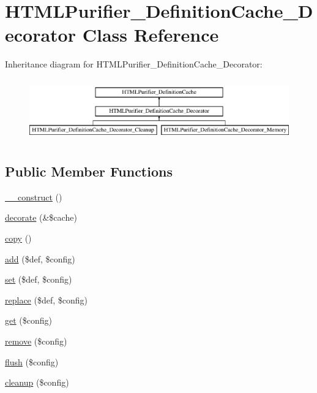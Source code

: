 \hypertarget{classHTMLPurifier__DefinitionCache__Decorator}{\section{H\+T\+M\+L\+Purifier\+\_\+\+Definition\+Cache\+\_\+\+Decorator Class Reference}
\label{classHTMLPurifier__DefinitionCache__Decorator}
}
Inheritance diagram for H\+T\+M\+L\+Purifier\+\_\+\+Definition\+Cache\+\_\+\+Decorator\+:\begin{figure}[H]
\begin{center}
\leavevmode
\includegraphics[height=2.700965cm]{classHTMLPurifier__DefinitionCache__Decorator}
\end{center}
\end{figure}
\subsection*{Public Member Functions}
\begin{DoxyCompactItemize}
\item 
\hyperlink{classHTMLPurifier__DefinitionCache__Decorator_a2c08b11ef2b39a3a256f2486c557488a}{\+\_\+\+\_\+construct} ()
\item 
\hyperlink{classHTMLPurifier__DefinitionCache__Decorator_a7e11368ddd75f7472efaf0010354e52d}{decorate} (\&\$cache)
\item 
\hyperlink{classHTMLPurifier__DefinitionCache__Decorator_aa9915b657c65ce426ea9145d6eb39fa2}{copy} ()
\item 
\hyperlink{classHTMLPurifier__DefinitionCache__Decorator_a303ee2de5ec896b11456081dbc5c0526}{add} (\$def, \$config)
\item 
\hyperlink{classHTMLPurifier__DefinitionCache__Decorator_afe7eec6c1fd107a2bb48cc4e37508c46}{set} (\$def, \$config)
\item 
\hyperlink{classHTMLPurifier__DefinitionCache__Decorator_a95ab717d1343a27c678c34a59207070f}{replace} (\$def, \$config)
\item 
\hyperlink{classHTMLPurifier__DefinitionCache__Decorator_affcddaa1216ae3591b593fc1705a3232}{get} (\$config)
\item 
\hyperlink{classHTMLPurifier__DefinitionCache__Decorator_a5197ecce94a81a39effc05887558155c}{remove} (\$config)
\item 
\hyperlink{classHTMLPurifier__DefinitionCache__Decorator_a1e9b2ce75506d8709007c9fd67665eae}{flush} (\$config)
\item 
\hyperlink{classHTMLPurifier__DefinitionCache__Decorator_a7e7f1ddf34d9f1cc4484e7ef16a10e07}{cleanup} (\$config)
\end{DoxyCompactItemize}

